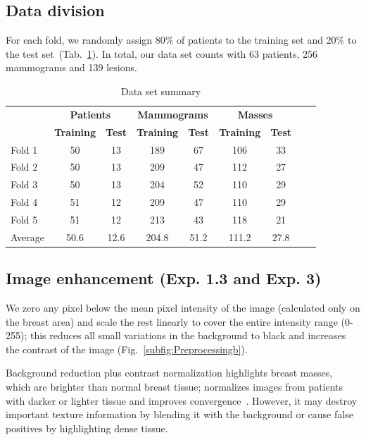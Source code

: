 \subsection{Data division}
For each fold, we randomly assign 80\% of patients to the training set and 20\% to the test set~(Tab.~\ref{tab:DataSetSummary}). In total, our data set counts with 63 patients, 256 mammograms and 139 lesions.

\begin{table}[h]
	\centering
	\begin{tabular}{lcccccccc}
		\hline
		& \multicolumn{2}{c}{\textbf{Patients}} & \multicolumn{2}{c}{\textbf{Mammograms}} &\multicolumn{2}{c}{\textbf{Masses}}\\
		& \textbf{Training} & \textbf{Test} & \textbf{Training} & \textbf{Test} & \textbf{Training} & \textbf{Test} \\
		\hline 
		Fold 1	&50	&13	&189	&67	&106	&33\\
		Fold 2	&50	&13	&209	&47	&112	&27\\
		Fold 3	&50	&13	&204	&52	&110	&29\\
		Fold 4	&51	&12	&209	&47	&110	&29\\
		Fold 5	&51	&12 &213	&43	&118	&21\\
		Average &50.6 &12.6 &204.8 &51.2 &111.2 &27.8\\
		\hline
	\end{tabular}
	\caption[Data set summary]{Data set summary}
	\label{tab:DataSetSummary}
\end{table}

\subsection{Image enhancement (Exp. 1.3 and Exp. 3)}
We zero any pixel below the mean pixel intensity of the image (calculated only on the breast area) and scale the rest linearly to cover the entire intensity range (0-255); this reduces all small variations in the background to black and increases the contrast of the image (Fig.~\ref{subfig:Preprocessingb}).

Background reduction plus contrast normalization highlights breast masses, which are brighter than normal breast tissue; normalizes images from patients with darker or lighter tissue and improves convergence~\cite{Arevalo2016}. However, it may destroy important texture information by blending it with the background or cause false positives by highlighting dense tissue.

